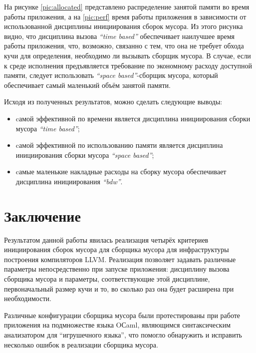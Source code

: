 На рисунке \ref{pic:allocated} представлено распределение занятой памяти во время работы 
приложения, а на \ref{pic:perf} время работы приложения в зависимости
от использованной дисциплины инициирования сборок мусора. Из этого рисунка видно, что дисциплина вызова 
\emph{``time based''} обеспечивает наилучшее время работы приложения, что, возможно,
связанно с тем, что она не требует обхода кучи для определения, необходимо 
ли вызывать сборщик мусора. В случае, если к среде исполнения предъявляется требование
по экономному расходу доступной памяти, следует использовать \emph{``space based''}-сборщик
мусора, который обеспечивает самый маленький объём занятой памяти.

Исходя из полученных результатов, можно сделать следующие выводы:
\begin{itemize}
\item cамой эффективной по времени является дисциплина инициирования сборки мусора
\emph{``time based''};
\item cамой эффективной по использованию памяти является дисциплина инициирования
сборки мусора \emph{``space based''};
\item cамые маленькие накладные расходы на сборку мусора обеспечивает
дисциплина инициирования \emph{``bdw''}.
\end{itemize}

\section*{Заключение}
Результатом данной работы явилась реализация
четырёх критериев инициирования сборок мусора для сборщика мусора для инфраструктуры
построения компиляторов LLVM.
Реализация позволяет задавать различные параметры непосредственно при запуске
приложения: дисциплину вызова сборщика мусора и параметры, соответствующие этой
дисциплине, первоначальный размер кучи и то, во сколько раз она будет расширена при необходимости.

Различные конфигурации сборщика мусора были протестированы при работе приложения на
подмножестве языка OСaml, являющимся синтаксическим анализатором для ``игрушечного языка'',
что помогло обнаружить и исправить несколько ошибок в реализации сборщика мусора.

